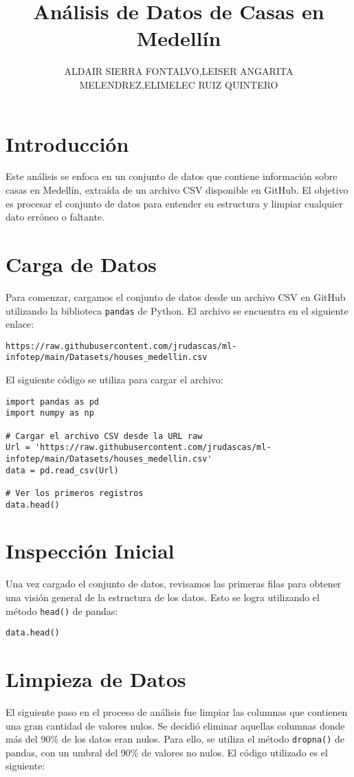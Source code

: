 \documentclass[12pt]{article}
\title{Análisis de Datos de Casas en Medellín}
\author{ALDAIR SIERRA FONTALVO,LEISER ANGARITA MELENDREZ,ELIMELEC RUIZ QUINTERO }
\begin{document}
\maketitle

\section{Introducción}
Este análisis se enfoca en un conjunto de datos que contiene información sobre casas en Medellín, extraída de un archivo CSV disponible en GitHub. El objetivo es procesar el conjunto de datos para entender su estructura y limpiar cualquier dato erróneo o faltante.

\section{Carga de Datos}
Para comenzar, cargamos el conjunto de datos desde un archivo CSV en GitHub utilizando la biblioteca \texttt{pandas} de Python. El archivo se encuentra en el siguiente enlace:

\begin{verbatim}
https://raw.githubusercontent.com/jrudascas/ml-infotep/main/Datasets/houses_medellin.csv
\end{verbatim}

El siguiente código se utiliza para cargar el archivo:

\begin{verbatim}
import pandas as pd
import numpy as np

# Cargar el archivo CSV desde la URL raw
Url = 'https://raw.githubusercontent.com/jrudascas/ml-infotep/main/Datasets/houses_medellin.csv'
data = pd.read_csv(Url)

# Ver los primeros registros
data.head()
\end{verbatim}

\section{Inspección Inicial}
Una vez cargado el conjunto de datos, revisamos las primeras filas para obtener una visión general de la estructura de los datos. Esto se logra utilizando el método \texttt{head()} de pandas:

\begin{verbatim}
data.head()
\end{verbatim}

\section{Limpieza de Datos}
El siguiente paso en el proceso de análisis fue limpiar las columnas que contienen una gran cantidad de valores nulos. Se decidió eliminar aquellas columnas donde más del 90\% de los datos eran nulos. Para ello, se utiliza el método \texttt{dropna()} de pandas, con un umbral del 90\% de valores no nulos. El código utilizado es el siguiente:
\end{document}
